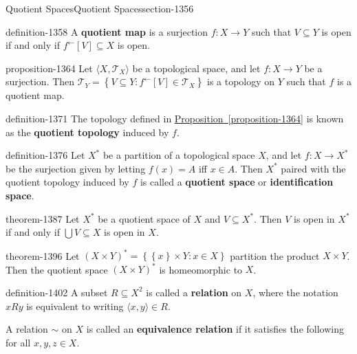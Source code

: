 \documentclass[oneside,10pt,]{article}
\newcommand{\terminology}[1]{\textbf{#1}}
\newcommand{\tuple}[1]{\langle #1 \rangle}
\newcommand{\mc}{\mathcal}
\newcommand{\setBuilder}[2]{\left\{#1:#2\right\}}
\newcommand{\setList}[1]{\left\{#1\right\}}
\begin{document}
\typeout{************************************************}
%
\begin{sectionptx}{Quotient Spaces}{}{Quotient Spaces}{}{}{section-1356}
\begin{definition}{}{definition-1358}%
\hypertarget{p-1359}{}%
A \terminology{quotient map} is a surjection \(f:X\to Y\) such that \(V\subseteq Y\) is open if and only if \(f^\leftarrow[V]\subseteq X\) is open.%
\end{definition}
\begin{proposition}{}{}{proposition-1364}%
\hypertarget{p-1365}{}%
Let \(\tuple{X,\mc T_X}\) be a topological space, and let \(f:X\to Y\) be a surjection. Then \(\mc T_Y=\setBuilder{V\subseteq Y}{f^\leftarrow[V]\in\mc T_X}\) is a topology on \(Y\) such that \(f\) is a quotient map.%
\end{proposition}
\begin{definition}{}{definition-1371}%
\hypertarget{p-1372}{}%
The topology defined in \hyperref[proposition-1364]{Proposition~\ref{proposition-1364}} is known as the \terminology{quotient topology} induced by \(f\).%
\end{definition}
\begin{definition}{}{definition-1376}%
\hypertarget{p-1377}{}%
Let \(X^*\) be a partition of a topological space \(X\), and let \(f:X\to X^*\) be the surjection given by letting \(f(x)=A\) iff \(x\in A\). Then \(X^*\) paired with the quotient topology induced by \(f\) is called a \terminology{quotient space} or \terminology{identification space}.%
\end{definition}
\begin{theorem}{}{}{theorem-1387}%
\hypertarget{p-1388}{}%
Let \(X^*\) be a quotient space of \(X\) and \(V\subseteq X^*\). Then \(V\) is open in \(X^*\) if and only if \(\bigcup V\subseteq X\) is open in \(X\).%
\end{theorem}
\begin{theorem}{}{}{theorem-1396}%
\hypertarget{p-1397}{}%
Let \((X\times Y)^*=\setBuilder{\setList{x}\times Y}{x\in X}\) partition the product \(X\times Y\). Then the quotient space \((X\times Y)^*\) is homeomorphic to \(X\).%
\end{theorem}
\begin{definition}{}{definition-1402}%
\hypertarget{p-1403}{}%
A subset \(R\subseteq X^2\) is called a \terminology{relation} on \(X\), where the notation \(xRy\) is equivalent to writing \(\tuple{x,y}\in R\).%
\par
\hypertarget{p-1409}{}%
A relation \(\sim\) on \(X\) is called an \terminology{equivalence relation} if it satisfies the following for all \(x,y,z\in X\).%

\end{definition}
\end{sectionptx}
\end{document}
